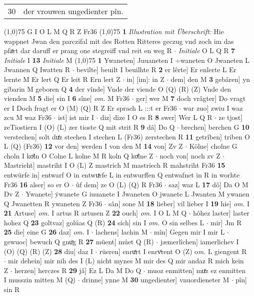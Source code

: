 \documentclass[8pt,a4paper,notitlepage]{article}
\begin{document}
\begin{table}[ht]
\begin{minipage}[t]{0.5\linewidth}
\begin{tabular}{rl}
30 & der vrouwen ungedienter pîn.\\ 
\end{tabular}
\scriptsize
\line(1,0){75} \newline
G I O L M Q R Z Fr36 \newline
\line(1,0){75} \newline
\textbf{1} \textit{Illustration mit Überschrift:} Hie wappnet Jwan den parczifal mit des Rotten Ritteres geczug vnd zoch im das pfaͯrt dar daruff er prang one stegreiff vnd reit en weg R   $\cdot$ \textit{Initiale} O L Q R  \textbf{7} \textit{Initiale} I  \textbf{13} \textit{Initiale} M  \newline
\line(1,0){75} \newline
\textbf{1} Ywaneten] Juuaneten I ÷waneten O Jwaneten L Jwannen Q Iwatten R  $\cdot$ bevilte] beuilt I beuilhte R \textbf{2} er lêrte] Er enlerte L Er lernte M Er lert Q Er leit R Ern lert Z  $\cdot$ in] [im]: in Z  $\cdot$ dem] den M \textbf{3} gebâren] yn gibarin M geboren Q \textbf{4} der vînde] Vnde der viende O (Q) (R) (Z) Vnde den vienden M \textbf{5} die] sin I \textbf{6} sîne] \textit{om.} M Fr36  $\cdot$ ger] wer M \textbf{7} doch vrâgter] Do vragt er I Doch fragt er O (M) (Q) R Z Er sprach L :::t er Fr36  $\cdot$ war zuo] zwiu I waz zcu M waz Fr36  $\cdot$ ist] ist mir I  $\cdot$ diz] dize I O es R \textbf{8} swer] Wer L Q R  $\cdot$ ze tjost] zeTiostiern I (O) (L) zer tioste Q mit strit R \textbf{9} dâ] Do Q  $\cdot$ brechen] berchen G \textbf{10} verstechen] solt duͤz stechen I stechen L (Fr36) zerstechen R \textbf{11} getrîben] triben O L (Q) (Fr36) \textbf{12} vor den] werden I von den M \textbf{14} von] Zv Z  $\cdot$ Kölne] cholne G choln I koͤln O Colne L kolne M R koln Q koͤlne Z  $\cdot$ noch von] noch zv Z  $\cdot$ Mastrieht] mastriht I O (L) Z mastrich M mastriech R mahstriht Fr36 \textbf{15} entwürfe in] entwarf O in entwuͯrfe L in entwurffen Q entwafnet in R in worhte Fr36 \textbf{16} alser] so er O  $\cdot$ ûf dem] ze O (L) (Q) R Fr36  $\cdot$ saz] waz L \textbf{17} dô] Da O M Dv Z  $\cdot$ Ywanete] ẏwanete G iuuanete I Jwaneten O jwanete L Jwanten M ywanen Q Jwanetten R ywaneten Z Fr36  $\cdot$ sân] sone M \textbf{18} lieber] vil lieber I \textbf{19} hie] \textit{om.} I \textbf{21} Artuse] \textit{om.} I artus R artusen Z \textbf{22} ouch] \textit{om.} I O L M Q  $\cdot$ hôhez laster] laster hohez Q \textbf{23} goltvaz] golúas Q (R) \textbf{24} sich] sin I \textit{om.} O sin selbes L  $\cdot$ mir] Jm R \textbf{25} die] eine G \textbf{26} daz] \textit{om.} I  $\cdot$ lachens] lachin M  $\cdot$ mîn] Gegen mir I mir L  $\cdot$ gewuoc] bewuch Q gnuͦg R \textbf{27} müent] múet Q (R)  $\cdot$ jæmerlîchen] iamerlichev I (O) (Q) (R) (Z) \textbf{28} diu] daz I  $\cdot$ rüeren] enruͤrt I enrvͦrent O (Z) o\textit{m. } L giengent R  $\cdot$ mir dehein] mir nih des I (L) nicht mynes M mir des Q mir andaz R mich kein Z  $\cdot$ herzen] herczes R \textbf{29} jâ] Ez L Da M Do Q  $\cdot$ muoz enmitten] muͤz ez enmitten I musszin mitten M (Q)  $\cdot$ drinne] ynne M \textbf{30} ungedienter] vnuordieneter M  $\cdot$ pîn] sin R \newline

\end{minipage}
\end{table}
\end{document}

